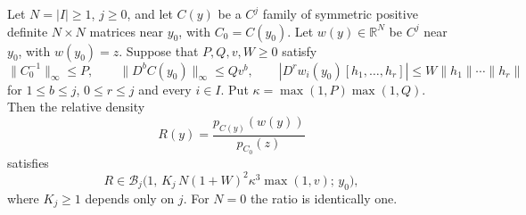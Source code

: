 \begin{lemma}\label{lem:gaussian-base-density}
Let $N=|I|\ge1$, $j\ge0$, and let $C(y)$ be a $C^j$ family of
symmetric positive definite $N\times N$ matrices near $y_0$, with
$C_0=C(y_0)$. Let $w(y)\in\mathbb R^N$ be $C^j$ near $y_0$, with
$w(y_0)=z$. Suppose that $P,Q,v,W\ge0$ satisfy
\begin{equation}\label{eq:gaussian-base-inputs}
 \|C_0^{-1}\|_\infty\le P,\qquad
 \|D^bC(y_0)\|_\infty\le Qv^b,\qquad
 |D^rw_i(y_0)[h_1,\ldots,h_r]|\le W\|h_1\|\cdots\|h_r\|
\end{equation}
for $1\le b\le j$, $0\le r\le j$ and every $i\in I$. Put
$\kappa=\max(1,P)\max(1,Q)$. Then the relative density
\[
 R(y)=\frac{p_{C(y)}(w(y))}{p_{C_0}(z)}
\]
satisfies
\begin{equation}\label{eq:gaussian-base-density}
 R\in\mathcal B_j\bigl(1,\,K_j\,N(1+W)^2\kappa^3\max(1,v);\,y_0\bigr),
\end{equation}
where $K_j\ge1$ depends only on $j$. For $N=0$ the ratio is identically
one.
\end{lemma}

